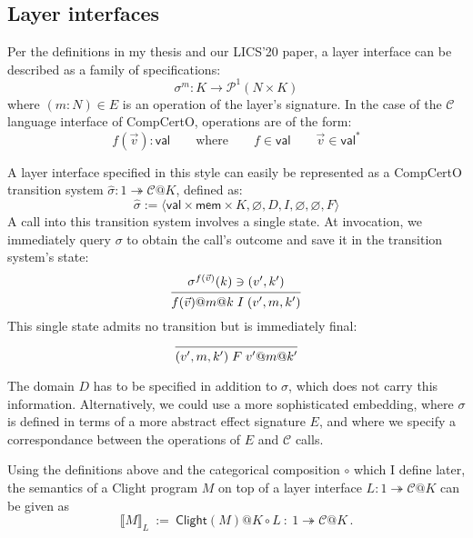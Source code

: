 \documentclass{article}
\begin{document}

\subsection{Layer interfaces} %

Per the definitions in my thesis and our LICS'20 paper,
a layer interface can be described as a family of specifications:
\[
    \sigma^m : K \rightarrow \mathcal{P}^1(N \times K)
\]
where $(m \mathbin: N) \in E$ is an operation of the layer's signature.
In the case of the $\mathcal{C}$ language interface of CompCertO,
operations are of the form:
\[
    f(\vec{v}) : \mathsf{val}
    \qquad
    \text{where}
    \qquad
    f \in \mathsf{val}
    \qquad
    \vec{v} \in \mathsf{val}^*
\]

A layer interface specified in this style
can easily be represented as a CompCertO transition system
$\hat{\sigma} : 1 \twoheadrightarrow \mathcal{C}@K$,
defined as:
\[
  \hat{\sigma} := \langle
    \mathsf{val} \times \mathsf{mem} \times K,
    \varnothing,
    D,
    I,
    \varnothing,
    \varnothing,
    F
  \rangle
\]
A call into this transition system involves a single state.
At invocation,
we immediately query $\sigma$ to obtain the call's outcome
and save it in the transition system's state:
\[
  \begin{prooftree}
    \hypo{\sigma^{f(\vec{v})}(k) \ni (v', k')}
    \infer1{f(\vec{v})@m@k \mathrel{I} (v', m, k')}
  \end{prooftree}
\]
This single state admits no transition but is immediately final:
\[
  \begin{prooftree}
    \infer0{(v', m, k') \mathrel{F} v'@m@k'}
  \end{prooftree}
\]

The domain $D$ has to be specified in addition to $\sigma$,
which does not carry this information.
Alternatively,
we could use a more sophisticated embedding,
where $\sigma$ is defined in terms of a more abstract
effect signature $E$,
and where we specify a correspondance between
the operations of $E$ and $\mathcal{C}$ calls.

Using the definitions above
and the categorical composition $\circ$ which I define later,
the semantics of a Clight program $M$
on top of a layer interface
$L : 1 \twoheadrightarrow \mathcal{C}@K$
can be given as
\[
  \llbracket M \rrbracket_L \: := \:
  \mathsf{Clight}(M)@K \circ L \: : \:
  1 \twoheadrightarrow \mathcal{C}@K
  \,.
\]

\end{document}
